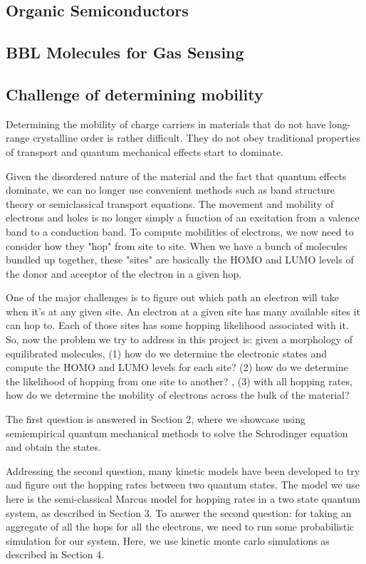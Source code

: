 \documentclass{article}
\begin{document}
\subsection{Organic Semiconductors}

\subsection{BBL Molecules for Gas Sensing}

\subsection{Challenge of determining mobility}

Determining the mobility of charge carriers in materials that do not have long-range crystalline order is rather difficult. They do not obey traditional properties of transport and quantum mechanical effects start to dominate.

Given the disordered nature of the material and the fact that quantum effects dominate, we can no longer use convenient methods such as band structure theory or semiclassical transport equations. The movement and mobility of electrons and holes is no longer simply a function of an excitation from a valence band to a conduction band. To compute mobilities of electrons, we now need to consider how they "hop" from site to site. When we have a bunch of molecules bundled up together, these "sites" are basically the HOMO and LUMO levels of the donor and acceptor of the electron in a given hop.

One of the major challenges is to figure out which path an electron will take when it's at any given site. An electron at a given site has many available sites it can hop to. Each of those sites has some hopping likelihood associated with it. So, now the problem we try to address in this project is: given a morphology of equilibrated molecules, (1) how do we determine the electronic states and compute the HOMO and LUMO levels for each site? (2) how do we determine the likelihood of hopping from one site to another? , (3) with all hopping rates, how do we determine the mobility of electrons across the bulk of the material?

The first question is answered in Section 2, where we showcase using semiempirical quantum mechanical methods to solve the Schrodinger equation and obtain the states.

Addressing the second question, many kinetic models have been developed to try and figure out the hopping rates between two quantum states. The model we use here is the semi-classical Marcus model for hopping rates in a two state quantum system, as described in Section 3. To answer the second question: for taking an aggregate of all the hops for all the electrons, we need to run some probabilistic simulation for our system. Here, we use kinetic monte carlo simulations as described in Section 4.
\end{document}

